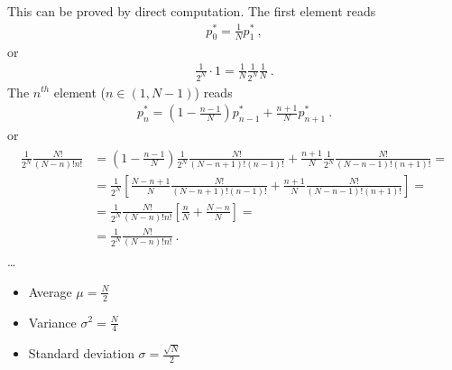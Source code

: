 \documentclass[letterpaper,10pt,english]{jupyterBook}
\begin{document}
\sphinxAtStartPar
This can be proved by direct computation. The first element reads
\begin{equation*}
\begin{split}p_0^* = \frac{1}{N} p_1^* \ ,\end{split}
\end{equation*}
\sphinxAtStartPar
or
\begin{equation*}
\begin{split}\frac{1}{2^N} \cdot 1 = \frac{1}{N} \frac{1}{2^N} \frac{1}{N} \ .\end{split}
\end{equation*}
\sphinxAtStartPar
The \(n^{th}\) element (\(n \in (1,N-1)\)) reads
\begin{equation*}
\begin{split}p_n^* = \left( 1-\frac{n-1}{N} \right) p_{n-1}^* + \frac{n+1}{N} p_{n+1}^* \ .\end{split}
\end{equation*}
\sphinxAtStartPar
or
\begin{equation*}
\begin{split}\begin{aligned}
 \frac{1}{2^N} \frac{N!}{(N-n)!n!}
 & = \left( 1 - \frac{n-1}{N} \right) \frac{1}{2^N} \frac{N!}{(N-n+1)! (n-1)!} + \frac{n+1}{N} \frac{1}{2^N} \frac{N!}{(N-n-1)! (n+1)!} = \\
 & = \frac{1}{2^N} \left[ \frac{N-n+1}{N} \frac{N!}{(N-n+1)!(n-1)!} + \frac{n+1}{N} \frac{N!}{(N-n-1)!(n+1)!} \right] = \\
 & = \frac{1}{2^N} \frac{N!}{(N-n)!n!} \left[ \frac{n}{N} + \frac{N-n}{N} \right] = \\
 & = \frac{1}{2^N} \frac{N!}{(N-n)!n!} \ .
\end{aligned}\end{split}
\end{equation*}
\sphinxAtStartPar
{} …

\sphinxAtStartPar
{}
\begin{itemize}
\item {} 
\sphinxAtStartPar
Average \(\mu = \frac{N}{2}\)

\item {} 
\sphinxAtStartPar
Variance \(\sigma^2 = \frac{N}{4}\)

\item {} 
\sphinxAtStartPar
Standard deviation  \(\sigma = \frac{\sqrt{N}}{2}\)

\end{itemize}
\end{document}
